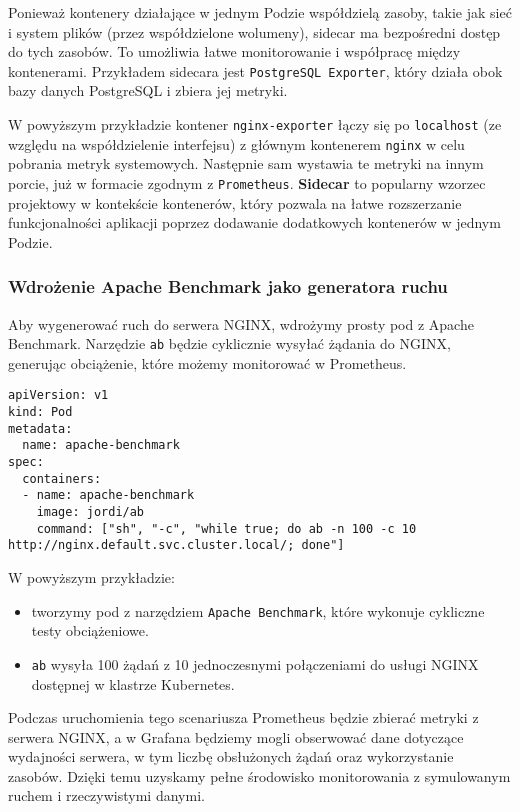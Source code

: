 \documentclass{article}
\begin{document}
Ponieważ kontenery działające w jednym Podzie współdzielą zasoby, takie jak sieć i system plików (przez współdzielone wolumeny), sidecar ma bezpośredni dostęp do tych zasobów. To umożliwia łatwe monitorowanie i współpracę między kontenerami. Przykładem sidecara jest \texttt{PostgreSQL Exporter}, który działa obok bazy danych PostgreSQL i zbiera jej metryki.

W powyższym przykładzie kontener \texttt{nginx-exporter} łączy się po \texttt{localhost} (ze względu na współdzielenie interfejsu) z głównym kontenerem \texttt{nginx} w celu pobrania metryk systemowych. Następnie sam wystawia te metryki na innym porcie, już w formacie zgodnym z \texttt{Prometheus}. \textbf{Sidecar} to popularny wzorzec projektowy w kontekście kontenerów, który pozwala na łatwe rozszerzanie funkcjonalności aplikacji poprzez dodawanie dodatkowych kontenerów w jednym Podzie.

\subsubsection{Wdrożenie Apache Benchmark jako generatora ruchu}

Aby wygenerować ruch do serwera NGINX, wdrożymy prosty pod z Apache Benchmark. Narzędzie \texttt{ab} będzie cyklicznie wysyłać żądania do NGINX, generując obciążenie, które możemy monitorować w Prometheus.

\begin{lstlisting}
apiVersion: v1
kind: Pod
metadata:
  name: apache-benchmark
spec:
  containers:
  - name: apache-benchmark
    image: jordi/ab
    command: ["sh", "-c", "while true; do ab -n 100 -c 10 http://nginx.default.svc.cluster.local/; done"]
\end{lstlisting}

W powyższym przykładzie:
\begin{itemize}
  \item tworzymy pod z narzędziem \texttt{Apache Benchmark}, które wykonuje cykliczne testy obciążeniowe.
  \item \texttt{ab} wysyła 100 żądań z 10 jednoczesnymi połączeniami do usługi NGINX dostępnej w klastrze Kubernetes.
\end{itemize}

Podczas uruchomienia tego scenariusza Prometheus będzie zbierać metryki z serwera NGINX, a w Grafana będziemy mogli obserwować dane dotyczące wydajności serwera, w tym liczbę obsłużonych żądań oraz wykorzystanie zasobów. Dzięki temu uzyskamy pełne środowisko monitorowania z symulowanym ruchem i rzeczywistymi danymi.
\end{document}
